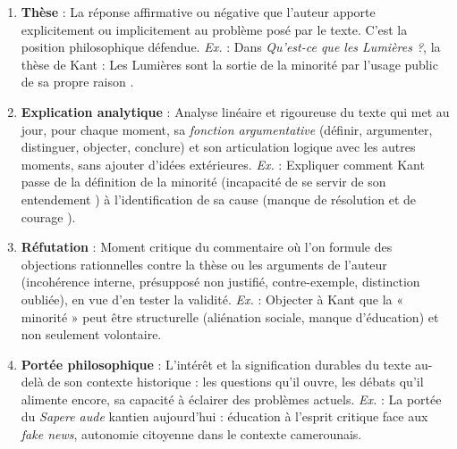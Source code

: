 \documentclass[11pt]{article}
\newcommand{\cle}[1]{{\popxbold\color{popdark}#1}}
\begin{document}
\begin{corrige}
\begin{enumerate}
\item \textbf{Thèse} : La réponse affirmative ou négative que l'auteur apporte explicitement ou implicitement au problème posé par le texte. C'est la \cle{position philosophique} défendue. \emph{Ex.} : Dans \emph{Qu'est-ce que les Lumières ?}, la thèse de Kant : \guillemotleft Les Lumières sont la sortie de la minorité par l'usage public de sa propre raison \guillemotright.
\item \textbf{Explication analytique} : Analyse linéaire et rigoureuse du texte qui met au jour, pour chaque moment, sa \emph{fonction argumentative} (définir, argumenter, distinguer, objecter, conclure) et son articulation logique avec les autres moments, sans ajouter d'idées extérieures. \emph{Ex.} : Expliquer comment Kant passe de la définition de la minorité (\guillemotleft incapacité de se servir de son entendement \guillemotright) à l'identification de sa cause (\guillemotleft manque de résolution et de courage \guillemotright).
\item \textbf{Réfutation} : Moment critique du commentaire où l'on formule des \cle{objections} rationnelles contre la thèse ou les arguments de l'auteur (incohérence interne, présupposé non justifié, contre-exemple, distinction oubliée), en vue d'en tester la validité. \emph{Ex.} : Objecter à Kant que la « minorité » peut être structurelle (aliénation sociale, manque d'éducation) et non seulement volontaire.
\item \textbf{Portée philosophique} : L'intérêt et la signification durables du texte au-delà de son contexte historique : les questions qu'il ouvre, les débats qu'il alimente encore, sa capacité à éclairer des problèmes actuels. \emph{Ex.} : La portée du \emph{Sapere aude} kantien aujourd'hui : éducation à l'esprit critique face aux \emph{fake news}, autonomie citoyenne dans le contexte camerounais.
\end{enumerate}
\end{corrige}
\end{document}
